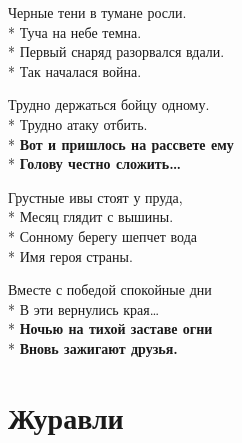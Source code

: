 \medskip

\begin{minipage}{\linewidth}
Черные тени в тумане росли.\\*
Туча на небе темна.\\*
Первый снаряд разорвался вдали.\\*
Так началася война.\\
\end{minipage}\par\medskip\nobreak

\medskip

\begin{minipage}{\linewidth}
Трудно держаться бойцу одному.\\*
Трудно атаку отбить.\\*
\textbf{Вот и пришлось на рассвете ему}\\*
\textbf{Голову честно сложить…}\\
\end{minipage}\par\medskip\nobreak

\medskip

\begin{minipage}{\linewidth}
Грустные ивы стоят у пруда,\\*
Месяц глядит с вышины.\\*
Сонному берегу шепчет вода\\*
Имя героя страны.\\
\end{minipage}\par\medskip\nobreak

\medskip

\begin{minipage}{\linewidth}
Вместе с победой спокойные дни\\*
В эти вернулись края…\\*
\textbf{Ночью на тихой заставе огни}\\*
\textbf{Вновь зажигают друзья.}\\
\end{minipage}

\vspace{\fill}\newpage

\section{Журавли}
\label{song:Журавли}

